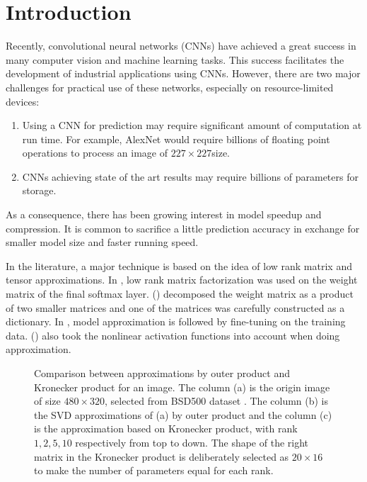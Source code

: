 \documentclass{article}
\begin{document}
\section{Introduction}
Recently, convolutional neural networks (CNNs) have achieved a great success in many computer vision and machine learning tasks. This success facilitates the development of industrial applications using CNNs. However, there are two major challenges for practical use of these networks, especially on resource-limited devices:
\begin{enumerate}
\item Using a CNN for prediction may require significant amount of computation at run time. For example, AlexNet\cite{krizhevsky2012imagenet} would
  require billions of floating point operations to process an image of $227\times 227 $size.
\item CNNs achieving state of the art results may require billions \cite{dean2012large,le2013building,Jaderberg14c} of parameters for storage.
\end{enumerate}
As a consequence, there has been growing interest in model speedup and compression. It is common to sacrifice a little prediction accuracy in exchange
for smaller model size and faster running speed.

In the literature, a major technique is based on the idea of low rank matrix and tensor approximations.
In \cite{sainath2013low}, low rank matrix factorization was used on the weight matrix of the final softmax layer. \citeauthor{denil2013predicting} (\citeyear{denil2013predicting}) decomposed the weight matrix as a product of two smaller matrices and one of the matrices was carefully constructed as a dictionary. In \cite{xue2013restructuring,denton2014exploiting}, model approximation is followed by fine-tuning on the training data. \citeauthor{zhang2015accelerating} (\citeyear{zhang2015accelerating}) also took the nonlinear activation functions into account when doing approximation.

\begin{figure}
\centering
{}
\caption{Comparison between approximations by outer product and Kronecker product for an image. The column (a) is the origin image of size $480\times 320$, selected from BSD500 dataset \cite{amfm_pami2011}. The column (b) is the SVD approximations of (a) by outer product and the column (c) is the approximation based on Kronecker product\cite{van1993approximation}, with rank $1, 2, 5, 10$ respectively from top to down. The shape of the right matrix in the Kronecker product is deliberately selected as $20\times 16$ to make the number of parameters equal for each rank.}
\label{fig:bears}
\end{figure}
\end{document}
